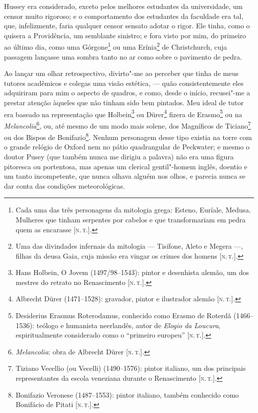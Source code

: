 Hussey era considerado, exceto pelos melhores estudantes da
universidade, um censor muito rigoroso; e o comportamento dos estudantes
da faculdade era tal, que, infelizmente, faria qualquer censor sensato
adotar o rigor. Ele tinha, como o quisera a Providência, um semblante
sinistro; e fora visto por mim, do primeiro ao último dia, como uma
Górgone\footnote{Cada uma das três personagens da mitologia grega:
  Esteno, Euríale, Medusa. Mulheres que tinham serpentes por cabelos e
  que transformariam em pedra quem as encarasse {[}\textsc{n.\,t.}{]}.} ou uma
Erínia\footnote{Uma das divindades infernais da mitologia --- Tisífone,
  Aleto e Megera ---, filhas da deusa Gaia, cuja missão era vingar os
  crimes dos homens {[}\textsc{n.\,t.}{]}.} de Christchurch, cuja passagem
lançasse uma sombra tanto no ar como sobre o pavimento de pedra.

Ao lançar um olhar retrospectivo, divirto"-me ao perceber que tinha de
meus tutores acadêmicos e colegas uma visão estética, --- quão
consistentemente eles adquiriram para mim o aspecto de quadros, e como,
desde o início, recusei"-me a prestar atenção àqueles que não tinham sido
bem pintados. Meu ideal de tutor era baseado na representação que
Holbein\footnote{Hans Holbein, O Jovem (1497/98--1543): pintor e
  desenhista alemão, um dos mestres do retrato no Renascimento {[}\textsc{n.\,t.}{]}.} ou Dürer\footnote{Albrecht Dürer (1471--1528): gravador, pintor
  e ilustrador alemão {[}\textsc{n.\,t.}{]}.} fizera de Erasmo\footnote{Desiderius
  Erasmus Roterodamus, conhecido como Erasmo de Roterdã
  (1466--1536):
  teólogo e humanista neerlandês, autor
  de \emph{Elogio da Loucura}, espiritualmente considerado como o
  ``primeiro europeu'' {[}\textsc{n.\,t.}{]}.} ou na
\emph{Melancolia}\footnote{\emph{Melancolia}: obra de Albrecht Dürer
  {[}\textsc{n.\,t.}{]}.}, ou, até mesmo de um modo mais solene, dos Magníficos
de Ticiano\footnote{Tiziano Vecellio (ou Vecelli) (1490--1576): pintor
  italiano, um dos principais representantes da escola veneziana durante
  o Renascimento {[}\textsc{n.\,t.}{]}.} ou dos Bispos de Bonifazio\footnote{Bonifazio
  Veronese (1487--1553): pintor italiano, também conhecido como Bonifácio
  de Pitati {[}\textsc{n.\,t.}{]}.}. Nenhum personagem desse tipo existia na
torre com o grande relógio de Oxford nem no pátio quadrangular de
Peckwater; e mesmo o doutor Pusey (que também nunca me dirigiu a
palavra) não era uma figura pitoresca ou portentosa, mas apenas um
clerical gentil"-homem inglês, doentio e um tanto incompetente, que nunca
olhava alguém nos olhos, e parecia nunca se dar conta das condições
meteorológicas.

